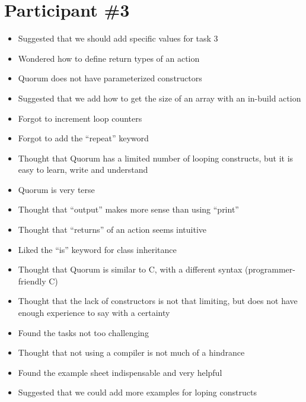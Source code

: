\section{Participant {\#}3}
\begin{itemize}
\item Suggested that we should add specific values for task 3
\item Wondered how to define return types of an action
\item Quorum does not have parameterized constructors
\item Suggested that we add how to get the size of an array with an in-build action
\item Forgot to increment loop counters
\item Forgot to add the “repeat” keyword
\item Thought that Quorum has a limited number of looping constructs, but it is easy to learn, write and understand
\item Quorum is very terse
\item Thought that “output” makes more sense than using “print”
\item Thought that “returns” of an action seems intuitive
\item Liked the “is” keyword for class inheritance
\item Thought that Quorum is similar to C, with a different syntax (programmer-friendly C) 
\item Thought that the lack of constructors is not that limiting, but does not have enough experience to say with a certainty
\item Found the tasks not too challenging 
\item Thought that not using a compiler is not much of a hindrance
\item Found the example sheet indispensable and very helpful
\item Suggested that we could add more examples for loping constructs
\end{itemize}
